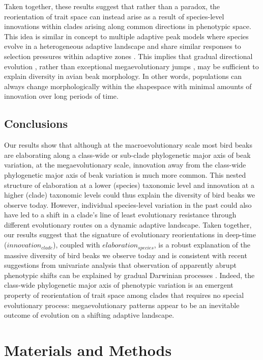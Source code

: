 \documentclass[12pt,letterpaper]{article}
\begin{document}
Taken together, these results suggest that rather than a paradox, the reorientation of trait space can instead arise as a result of species-level innovations within clades arising along common directions in phenotypic space.
This idea is similar in concept to multiple adaptive peak models where species evolve in a heterogeneous adaptive landscape and share similar responses to selection pressures within adaptive zones \cite{hansen1997stabilizing}.
This implies that gradual directional evolution \cite{pagel2022general}, rather than exceptional megaevolutionary jumps \cite{venditti2011multiple,cooney2017mega}, may be sufficient to explain diversity in avian beak morphology.
In other words, populations can always change morphologically within the shapespace with minimal amounts of innovation over long periods of time. %

\subsection{Conclusions}
Our results show that although at the macroevolutionary scale most bird beaks are elaborating along a class-wide or sub-clade phylogenetic major axis of beak variation, at the megaevolutionary scale, innovation away from the class-wide phylogenetic major axis of beak variation is much more common.
This nested structure of elaboration at a lower (species) taxonomic level and innovation at a higher (clade) taxonomic levels could thus explain the diversity of bird beaks we observe today.
However, individual species-level variation in the past could also have led to a shift in a clade's line of least evolutionary resistance through different evolutionary routes on a dynamic adaptive landscape.
Taken together, our results suggest that the signature of evolutionary reorientations in deep-time ($innovation_{clade}$), coupled with $elaboration_{species}$, is a robust explanation of the massive diversity of bird beaks we observe today and is consistent with recent suggestions from univariate analysis that observation of apparently abrupt phenotypic shifts can be explained by gradual Darwinian processes \cite{pagel2022general, BurinWhales,goswami2022}.
Indeed, the class-wide phylogenetic major axis of phenotypic variation is an emergent property of reorientation of trait space among clades that requires no special evolutionary process: megaevolutionary patterns appear to be an inevitable outcome of evolution on a shifting adaptive landscape.
 
\section{Materials and Methods}
\end{document}
